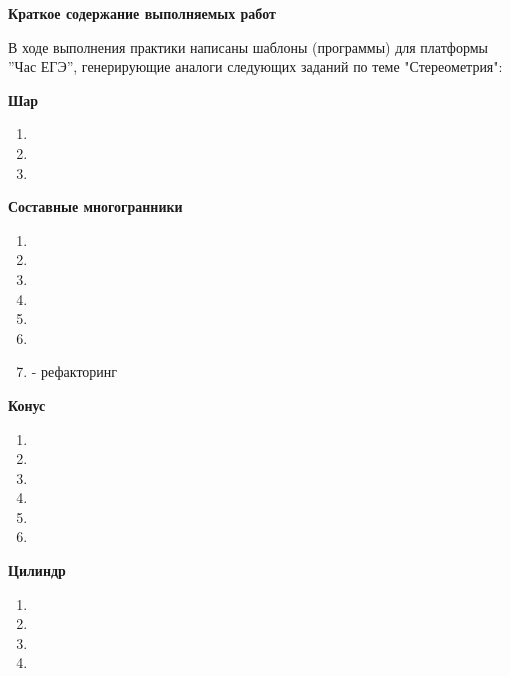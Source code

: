 \begin{center}
	\large\textbf{Краткое содержание выполняемых работ}\\
\end{center}

В ходе выполнения практики написаны шаблоны (программы) для платформы ”Час ЕГЭ”, генерирующие аналоги следующих заданий по теме "Стереометрия":

\textbf{Шар}

\begin{enumerate}
	\item {}
	\item {}
	\item {}
\end{enumerate}

\textbf{Составные многогранники}

\begin{enumerate}
	\item {}
	\item {}
	\item {}
	\item {}
	\item {}
	\item {}
	\item {} - рефакторинг
\end{enumerate}

\textbf{Конус}

\begin{enumerate}
	\item {}
	\item {}
	\item {}
	\item {}
	\item {}
	\item {}
\end{enumerate}

\textbf{Цилиндр}

\begin{enumerate}
	\item {}
	\item {}
	\item {}
	\item {}
\end{enumerate}

